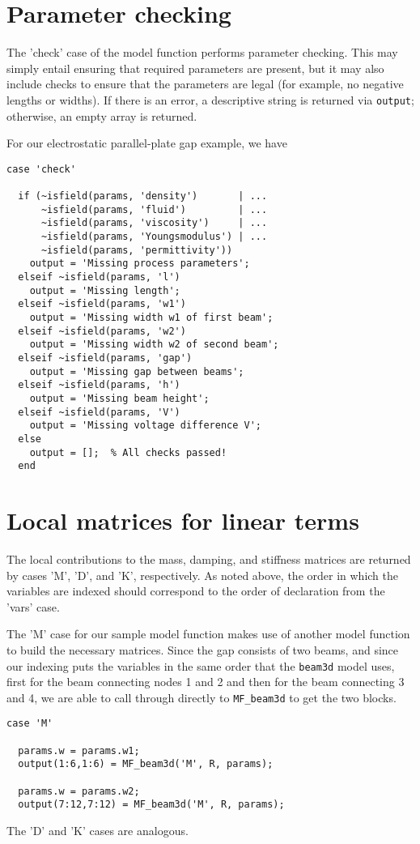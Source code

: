 \section{Parameter checking}

The 'check' case of the model function performs parameter checking.
This may simply entail ensuring that required parameters are present,
but it may also include checks to ensure that the parameters are legal
(for example, no negative lengths or widths).  If there is an error,
a descriptive string is returned via \texttt{output}; otherwise,
an empty array is returned.

For our electrostatic parallel-plate gap example, we have
\begin{verbatim}
case 'check'

  if (~isfield(params, 'density')       | ...
      ~isfield(params, 'fluid')         | ...
      ~isfield(params, 'viscosity')     | ...
      ~isfield(params, 'Youngsmodulus') | ...
      ~isfield(params, 'permittivity'))
    output = 'Missing process parameters';
  elseif ~isfield(params, 'l')
    output = 'Missing length';
  elseif ~isfield(params, 'w1')
    output = 'Missing width w1 of first beam';
  elseif ~isfield(params, 'w2')
    output = 'Missing width w2 of second beam';
  elseif ~isfield(params, 'gap')
    output = 'Missing gap between beams';
  elseif ~isfield(params, 'h') 
    output = 'Missing beam height';
  elseif ~isfield(params, 'V')
    output = 'Missing voltage difference V';
  else
    output = [];  % All checks passed!
  end

\end{verbatim}


\section{Local matrices for linear terms}

The local contributions to the mass, damping, and stiffness matrices
are returned by cases 'M', 'D', and 'K', respectively.  As noted above,
the order in which the variables are indexed should correspond to the
order of declaration from the 'vars' case.

The 'M' case for our sample model function makes use of another model
function to build the necessary matrices.  Since the gap consists of
two beams, and since our indexing puts the variables in the same order
that the \texttt{beam3d} model uses, first for the beam connecting nodes
1 and 2 and then for the beam connecting 3 and 4, we are able to call
through directly to \texttt{MF\_beam3d} to get the two blocks.
\begin{verbatim}
case 'M'

  params.w = params.w1;
  output(1:6,1:6) = MF_beam3d('M', R, params);

  params.w = params.w2;
  output(7:12,7:12) = MF_beam3d('M', R, params);

\end{verbatim}
The 'D' and 'K' cases are analogous.



